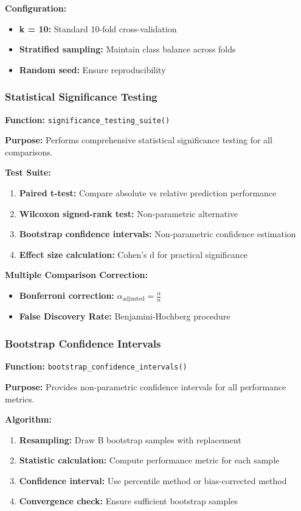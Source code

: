 \textbf{Configuration:}
\begin{itemize}
    \item \textbf{k = 10:} Standard 10-fold cross-validation
    \item \textbf{Stratified sampling:} Maintain class balance across folds
    \item \textbf{Random seed:} Ensure reproducibility
\end{itemize}

\subsubsection{Statistical Significance Testing}

\textbf{Function:} \texttt{significance\_testing\_suite()}

\textbf{Purpose:} Performs comprehensive statistical significance testing for all comparisons.

\textbf{Test Suite:}
\begin{enumerate}
    \item \textbf{Paired t-test:} Compare absolute vs relative prediction performance
    \item \textbf{Wilcoxon signed-rank test:} Non-parametric alternative
    \item \textbf{Bootstrap confidence intervals:} Non-parametric confidence estimation
    \item \textbf{Effect size calculation:} Cohen's d for practical significance
\end{enumerate}

\textbf{Multiple Comparison Correction:}
\begin{itemize}
    \item \textbf{Bonferroni correction:} $\alpha_{\text{adjusted}} = \frac{\alpha}{n}$
    \item \textbf{False Discovery Rate:} Benjamini-Hochberg procedure
\end{itemize}

\subsubsection{Bootstrap Confidence Intervals}

\textbf{Function:} \texttt{bootstrap\_confidence\_intervals()}

\textbf{Purpose:} Provides non-parametric confidence intervals for all performance metrics.

\textbf{Algorithm:}
\begin{enumerate}
    \item \textbf{Resampling:} Draw B bootstrap samples with replacement
    \item \textbf{Statistic calculation:} Compute performance metric for each sample
    \item \textbf{Confidence interval:} Use percentile method or bias-corrected method
    \item \textbf{Convergence check:} Ensure sufficient bootstrap samples
\end{enumerate}

